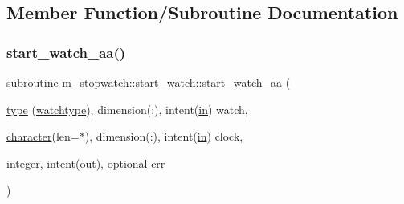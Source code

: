 \subsection{Member Function/\+Subroutine Documentation}
\mbox{\label{interfacem__stopwatch_1_1start__watch_abb96a8ce730416c708a45b57a7f12051}} 
\subsubsection{\texorpdfstring{start\+\_\+watch\+\_\+aa()}{start\_watch\_aa()}}
{\footnotesize\ttfamily \hyperlink{M__stopwatch_83_8txt_acfbcff50169d691ff02d4a123ed70482}{subroutine} m\+\_\+stopwatch\+::start\+\_\+watch\+::start\+\_\+watch\+\_\+aa (\begin{DoxyParamCaption}\item[{\hyperlink{stop__watch_83_8txt_a70f0ead91c32e25323c03265aa302c1c}{type} (\hyperlink{structm__stopwatch_1_1watchtype}{watchtype}), dimension(\+:), intent(\hyperlink{M__journal_83_8txt_afce72651d1eed785a2132bee863b2f38}{in})}]{watch,  }\item[{\hyperlink{option__stopwatch_83_8txt_abd4b21fbbd175834027b5224bfe97e66}{character}(len=$\ast$), dimension(\+:), intent(\hyperlink{M__journal_83_8txt_afce72651d1eed785a2132bee863b2f38}{in})}]{clock,  }\item[{integer, intent(out), \hyperlink{option__stopwatch_83_8txt_aa4ece75e7acf58a4843f70fe18c3ade5}{optional}}]{err }\end{DoxyParamCaption})\hspace{0.3cm}{\ttfamily [private]}}

\mbox{\label{interfacem__stopwatch_1_1start__watch_a19b66cdb356d70bdf5581f1532d19c80}} 
